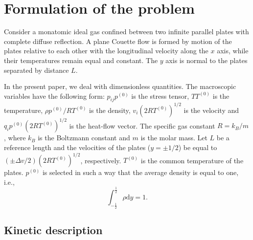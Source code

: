 \documentclass[review]{elsarticle}
\newcommand{\dd}{\mathrm{d}}
\begin{document}
\section{Formulation of the problem}

Consider a monatomic ideal gas confined between two infinite parallel plates
with complete diffuse reflection.
A plane Couette flow is formed by motion of the plates relative to each other
with the longitudinal velocity along the \(x\) axis,
while their temperatures remain equal and constant.
The \(y\) axis is normal to the plates separated by distance \(L\).

In the present paper, we deal with dimensionless quantities. The macroscopic variables
have the following form: \(p_{ij}p^{(0)}\) is the stress tensor, \(TT^{(0)}\) is the temperature,
\(\rho p^{(0)}/RT^{(0)}\) is the density, \(v_i(2RT^{(0)})^{1/2}\) is the velocity
and \(q_ip^{(0)}(2RT^{(0)})^{1/2}\) is the heat-flow vector.
The specific gas constant \(R = k_B/m\), where \(k_B\) is the Boltzmann constant
and \(m\) is the molar mass.
Let \(L\) be a reference length and the velocities of the plates (\(y=\pm1/2\))
be equal to \((\pm\Delta{v}/2)(2RT^{(0)})^{1/2}\), respectively.
\(T^{(0)}\) is the common temperature of the plates.
\(p^{(0)}\) is selected in such a way that the average density is equal to one, i.e.,
\begin{equation}\label{eq:total_mass}
    \int_{-\frac12}^\frac12\rho\dd{y} = 1.
\end{equation}

\subsection{Kinetic description}
\end{document}
